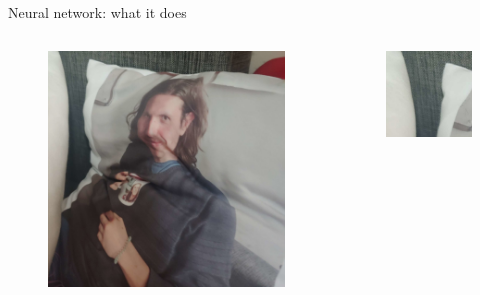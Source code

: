 \documentclass{beamer}
\begin{document}
\begin{frame}{Neural network: what it does}
\vspace{-1.5cm}
    \begin{columns}
        \begin{column}{0.35\textwidth}
            \begin{figure}
                \centering
                \includegraphics[width=\linewidth]{distorted/distorted.png}
            \end{figure}\pause
        \end{column}
        \begin{column}{0.05\textwidth}
            \begin{figure}
                \centering
                \includegraphics[width=\linewidth]{distorted/distorted-0-0}

\end{figure}
\end{column}
\end{columns}
\end{frame}
\end{document}
